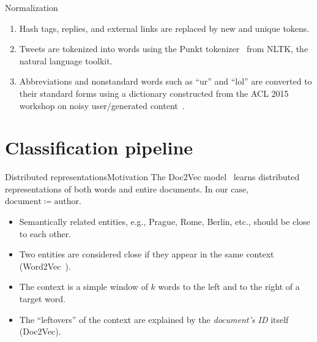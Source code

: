 \documentclass[xcolor={svgnames, table}, usepdftitle=false]{beamer}
\begin{document}
\begin{frame}{Normalization}
  \begin{enumerate}
  \item Hash tags, replies, and external links are replaced by new and
    unique tokens.
  \item Tweets are tokenized into words using the Punkt
    tokenizer~\autocite{Kiss:2006:UMS:1245119.1245122} from NLTK, the
    natural language toolkit.
  \item Abbreviations and nonstandard words such as \enquote{ur} and
    \enquote{lol} are converted to their standard forms using a
    dictionary constructed from the ACL 2015 workshop on noisy
    user\-/generated content~\autocite{Han:2012:ACN:2390948.2391000}.
  \end{enumerate}
\end{frame}

\section{Classification pipeline}

\begin{frame}{Distributed representations}{Motivation}
  The \textsf{Doc2Vec} model~\autocite{pmlr-v32-le14} learns
  distributed representations of both words and entire documents.  In
  our case, \(\mathrm{document} \coloneqq \mathrm{author}\).
  \begin{itemize}
  \item Semantically related entities, e.g., Prague, Rome, Berlin,
    etc., should be close to each other.
  \item Two entities are considered close if they appear in the same
    context
    (\textsf{Word2Vec}~\autocite{Mikolov:2013:DRW:2999792.2999959}).
  \item The context is a simple window of \(k\) words to the left and
    to the right of a target word.
  \item The \enquote{leftovers} of the context are explained by the
    \emph{document's ID} itself (\textsf{Doc2Vec}).
  \end{itemize}
\end{frame}
\end{document}
